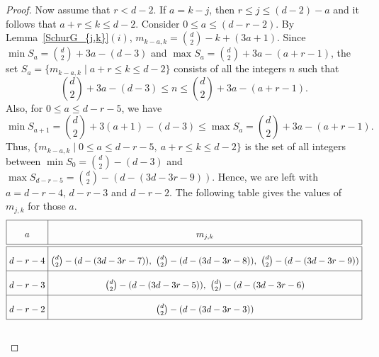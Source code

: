 \documentclass[10pt,a4paper]{amsart}
\begin{document}
\begin{proof}
Now assume that $r<d-2$.  If $a=k-j$, then ${r \le j \le (d-2)-a}$ and it follows that ${a+r \le k \le d-2}$. 
Consider ${0 \le a \le (d-r-2)}$. By Lemma~\ref{SchurG_{j,k}}$(i)$, $m_{k-a,k}
=\binom{d}{2}-k+(3a+1)$. Since $\min {S_{a}}=\binom{d}{2}+3a-(d-3) $ and $ {\max{S_{a}}= \binom{d}{2}+3a -(a+r-1)}$, the set
$S_a={\{m_{k-a,k}\mid a+r \le k \le d-2\}}$  consists of all the integers $n$ such that
$$ \binom{d}{2}+3a-(d-3) \leq n \leq  \binom{d}{2}+3a -(a+r-1).$$
Also, for  $0\leq a \leq d-r-5$, we have $${\min{S_{a+1}}=\binom{d}{2}+3(a+1)-(d-3)\le \max{S_{a}}=\binom{d}{2}+3a -(a+r-1)}.$$ 
Thus, 
${\{m_{k-a,k} \mid 0\leq a \leq d-r-5,\ a+r \leq k \leq d-2\}}$  is the set of all integers between $\min{S_0}=\binom{d}{2}-(d-3)$ and ${\max{S_{d-r-5}}=\binom{d}{2}-(d-(3d-3r-9))}$. 
Hence, we are left with ${a=d-r-4}$, ${d-r-3}$ and $d-r-2$. The following table gives the values of $m_{j,k}$ for those $a$.
\[\setlength{\tabcolsep}{3pt} %
\renewcommand{\arraystretch}{2.2} %
{\footnotesize
\begin{tabular}{|c|c |} 
	\hline
	$a$ &  $m_{j,k}$ \\ [0.005ex] 
	\hline\hline 
    $d-r-4$ & $\binom{d}{2}-(d-(3d-3r-7)),~\binom{d}{2}-(d-(3d-3r-8)),~\binom{d}{2}-(d-(3d-3r-9))$\\
    \hline
    $d-r-3$ & $\binom{d}{2}-(d-(3d-3r-5)),~\binom{d}{2}-(d-(3d-3r-6)$\\
    \hline
    $d-r-2$ & $\binom{d}{2}-(d-(3d-3r-3))$\\
    \hline
    \end{tabular}}\]\\

\end{proof}
\end{document}
